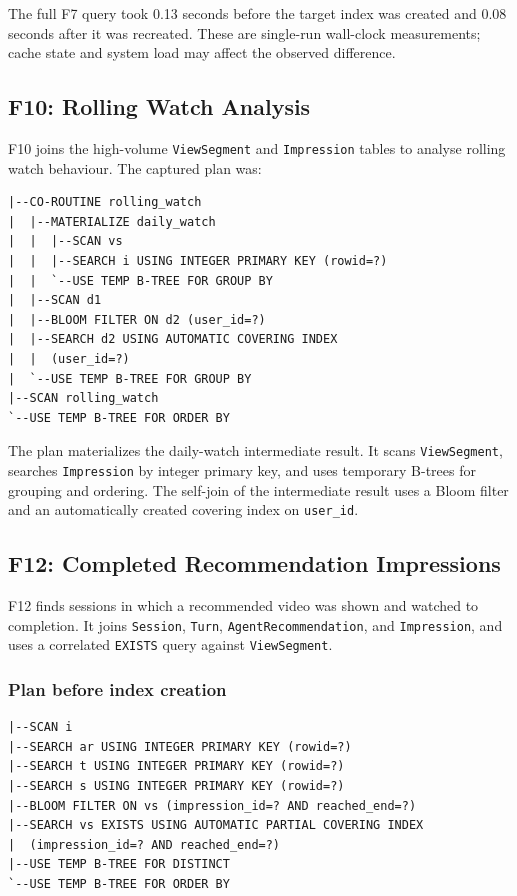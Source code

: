 \documentclass[11pt,a4paper]{article}
\begin{document}
The full F7 query took 0.13 seconds before the target index
was created and 0.08 seconds after it was recreated. These are
single-run wall-clock measurements; cache state and system load
may affect the observed difference.

\subsection{F10: Rolling Watch Analysis}

F10 joins the high-volume \texttt{ViewSegment} and \texttt{Impression}
tables to analyse rolling watch behaviour. The captured plan was:

\begin{lstlisting}[style=textstyle]
|--CO-ROUTINE rolling_watch
|  |--MATERIALIZE daily_watch
|  |  |--SCAN vs
|  |  |--SEARCH i USING INTEGER PRIMARY KEY (rowid=?)
|  |  `--USE TEMP B-TREE FOR GROUP BY
|  |--SCAN d1
|  |--BLOOM FILTER ON d2 (user_id=?)
|  |--SEARCH d2 USING AUTOMATIC COVERING INDEX
|  |  (user_id=?)
|  `--USE TEMP B-TREE FOR GROUP BY
|--SCAN rolling_watch
`--USE TEMP B-TREE FOR ORDER BY
\end{lstlisting}

The plan materializes the daily-watch intermediate result. It scans
\texttt{ViewSegment}, searches \texttt{Impression} by integer primary
key, and uses temporary B-trees for grouping and ordering. The
self-join of the intermediate result uses a Bloom filter and an
automatically created covering index on \texttt{user\_id}.

\subsection{F12: Completed Recommendation Impressions}

F12 finds sessions in which a recommended video was shown and
watched to completion. It joins \texttt{Session}, \texttt{Turn},
\texttt{AgentRecommendation}, and \texttt{Impression}, and uses a
correlated \texttt{EXISTS} query against \texttt{ViewSegment}.

\subsubsection{Plan before index creation}

\begin{lstlisting}[style=textstyle]
|--SCAN i
|--SEARCH ar USING INTEGER PRIMARY KEY (rowid=?)
|--SEARCH t USING INTEGER PRIMARY KEY (rowid=?)
|--SEARCH s USING INTEGER PRIMARY KEY (rowid=?)
|--BLOOM FILTER ON vs (impression_id=? AND reached_end=?)
|--SEARCH vs EXISTS USING AUTOMATIC PARTIAL COVERING INDEX
|  (impression_id=? AND reached_end=?)
|--USE TEMP B-TREE FOR DISTINCT
`--USE TEMP B-TREE FOR ORDER BY
\end{lstlisting}
\end{document}
